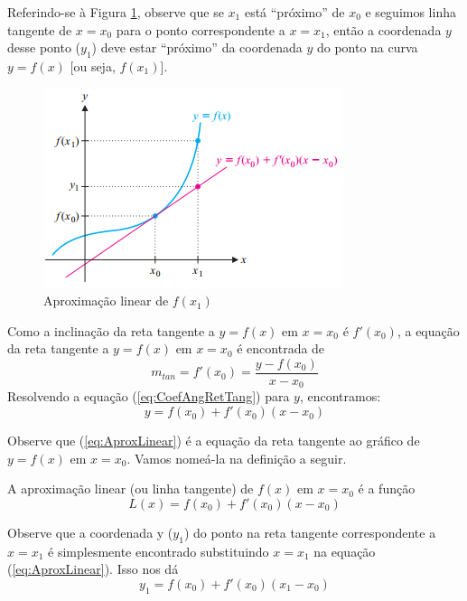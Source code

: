 \cleardoublepage\documentclass[../main.tex]{subfiles}
\begin{document}
Referindo-se à Figura \ref{fig:aproxLinearfx1}, observe que se $x_1$ está ``próximo'' de $x_0$ e seguimos linha  tangente
de $x = x_0$ para o ponto correspondente a $x = x_1$, então a coordenada $y $ desse ponto ($y_1$) deve estar ``próximo''  da coordenada $y$ do ponto na curva $y = f (x)$ [ou seja, $f (x_1)$].
\begin{figure}[H]
    \centering
    \includegraphics[scale=1.2]{fig_AproxLinear/AproxLinear-Fx1.png}
    \caption{Aproximação linear de $f(x_1)$}
    \label{fig:aproxLinearfx1}
\end{figure}
Como a inclinação da reta tangente a $y = f (x)$ em $x = x_0$ é \(f'(x_0)\), a equação da reta tangente a $y = f (x)$ em $x = x_0$ é encontrada de
\begin{equation}
m_{tan}=f'(x_0)=\frac{y-f(x_0)}{x-x_0}\label{eq:CoefAngRetTang}
\end{equation}
Resolvendo a equação (\ref{eq:CoefAngRetTang}) para $y$, encontramos:
\begin{equation}
    y=f(x_0)+f'(x_0)(x-x_0)\label{eq:AproxLinear}
\end{equation}

Observe que (\ref{eq:AproxLinear}) é a equação da reta tangente ao gráfico de $y = f (x)$ em $x = x_0$. Vamos nomeá-la na definição a seguir.
\begin{definition}\label{def:AproxLinear}
A aproximação linear (ou linha tangente) de $f (x)$ em $x = x_0$ é a função $$L(x)=f(x_0)+f'(x_0)(x-x_0)$$
\end{definition}

Observe que a coordenada y ($y_1$) do ponto na reta tangente correspondente a $x = x_1$ é simplesmente encontrado substituindo $x = x_1$ na equação (\ref{eq:AproxLinear}). Isso nos dá
\begin{equation}
    y_1=f(x_0)+f'(x_0)(x_1-x_0)\label{eq:AproxLinear-y1}
\end{equation}
\end{document}
